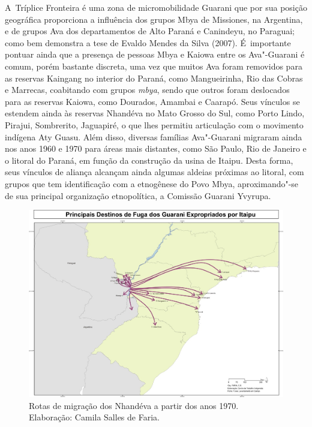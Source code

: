 A~Tríplice Fronteira é uma zona de micromobilidade Guarani que por sua
posição geográfica proporciona a influência dos grupos Mbya de
Missiones, na Argentina, e de grupos Ava dos departamentos de Alto
Paraná e Canindeyu, no Paraguai; como bem demonstra a tese de Evaldo
Mendes da Silva (2007). É~importante pontuar ainda que a presença de
pessoas Mbya e Kaiowa entre os Ava"-Guarani é comum, porém bastante
discreta, uma vez que muitos Ava foram removidos para as reservas
Kaingang no interior do Paraná, como Mangueirinha, Rio das Cobras e
Marrecas, coabitando com grupos \emph{mbya}, sendo que outros foram deslocados
para as reservas Kaiowa, como Dourados, Amambai e Caarapó. Seus
vínculos se estendem ainda às reservas Nhandéva no Mato Grosso do Sul,
como Porto Lindo, Pirajui, Sombrerito, Jaguapiré, o que lhes permitiu
articulação com o movimento indígena Aty Guasu. Além disso, diversas
famílias Ava"-Guarani migraram ainda nos anos 1960 e 1970 para áreas
mais distantes, como São Paulo, Rio de Janeiro e o litoral do Paraná,
em função da construção da usina de Itaipu. Desta forma, seus vínculos
de aliança alcançam ainda algumas aldeias próximas ao litoral, com
grupos que tem identificação com a etnogênese do Povo Mbya,
aproximando"-se de sua principal organização etnopolítica, a Comissão
Guarani Yvyrupa.

 \begin{figure}
  \centering
 \includegraphics[width=\textwidth]{./img/GUARANIS-img8.jpg}	
  \hfill
  \caption{Rotas de migração dos Nhandéva a
partir dos anos 1970. Elaboração: Camila Salles de Faria.}
\end{figure}

